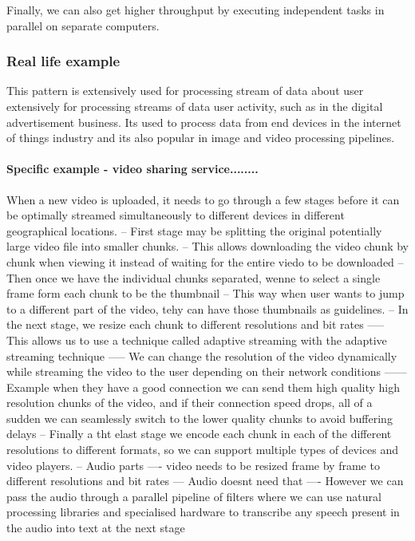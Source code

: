 \documentclass[a4paper, 11pt]{book}
\begin{document}
{    Finally, we can also get higher throughput by executing independent tasks in parallel on separate computers.

    \subsubsection{Real life example}
    This pattern is extensively used for processing stream of data about user extensively for processing streams of data user activity, such as in the digital advertisement business.
    Its used to process data from end devices in the internet of things industry and its also popular in image and video processing pipelines.

    \paragraph{Specific example - video sharing service........}
    When a new video is uploaded, it needs to go through a few stages before it can be optimally streamed simultaneously to different devices in different geographical locations.
    -- First stage may be splitting the original potentially large video file into smaller chunks.
    -- This allows downloading the video chunk by chunk when viewing it instead of waiting for the entire viedo to be downloaded
    -- Then once we have the individual chunks separated, wenne to select a single frame form each chunk to be the thumbnail
    -- This way when user wants to jump to a different part of the video, tehy can have those thumbnails as guidelines.
    -- In the next stage, we resize each chunk to different resolutions and bit rates
    ----- This allows us to use a technique called adaptive streaming with the adaptive streaming technique
    ----- We can change the resolution of the video dynamically while streaming the video to the user depending on their network conditions
    ------ Example when they have a good connection we can send them high quality high resolution chunks of the video, and if their connection speed drops, all of a sudden we can seamlessly switch to the lower quality chunks to avoid buffering delays
    -- Finally a tht elast stage we encode each chunk in each of the different resolutions to different formats, so we can support multiple types of devices and video players.
    -- Audio parts
    ---- video needs to be resized frame by frame to different resolutions and bit rates
    --- Audio doesnt need that
    ---- However we can pass the audio through a parallel pipeline of filters where we can use natural processing libraries and specialised hardware to transcribe any speech present in the audio into text at the next stage
}
\end{document}
